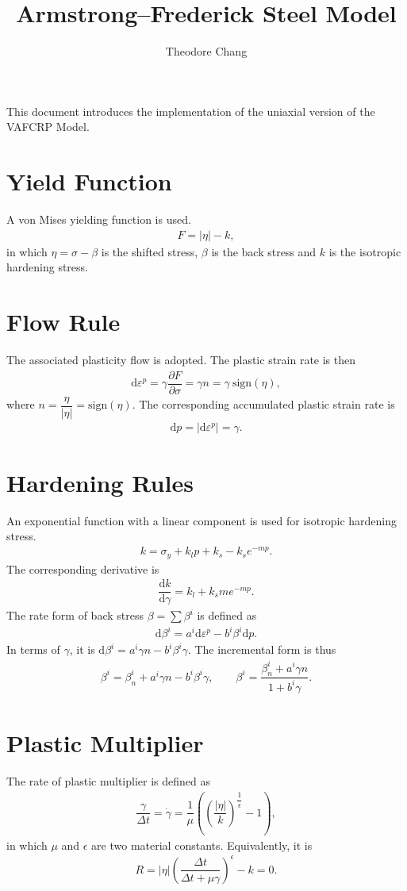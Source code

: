 \documentclass[a4paper,10pt,fleqn]{article}
\title{Armstrong--Frederick Steel Model}
\author{Theodore Chang}
\date{}\pagestyle{empty}
\newcommand*{\md}[1]{\mathrm{d}#1}
\newcommand*{\sign}[1]{\mathrm{sign}\left(#1\right)}
\newcommand*{\pfrac}[2]{\dfrac{\partial#1}{\partial#2}}
\newcommand*{\ddfrac}[2]{\dfrac{\md#1}{\md#2}}
\begin{document}
\noindent{}This document introduces the implementation of the uniaxial version of the VAFCRP Model.
\section{Yield Function}
A von Mises yielding function is used.
\begin{gather}
F=\Big|\eta\Big|-k,
\end{gather}
in which $\eta=\sigma-\beta$ is the shifted stress, $\beta$ is the back stress and $k$ is the isotropic hardening stress.
\section{Flow Rule}
The associated plasticity flow is adopted. The plastic strain rate is then
\begin{gather}
\md{\varepsilon^p}=\gamma\pfrac{F}{\sigma}=\gamma{}n=\gamma~\sign{\eta},
\end{gather}
where $n=\dfrac{\eta}{\Big|\eta\Big|}=\sign{\eta}$. The corresponding accumulated plastic strain rate is
\begin{gather}
\md{p}=\Big|\md{\varepsilon^p}\Big|=\gamma.
\end{gather}
\section{Hardening Rules}
An exponential function with a linear component is used for isotropic hardening stress.
\begin{gather}
k=\sigma_y+k_lp+k_s-k_se^{-mp}.
\end{gather}
The corresponding derivative is
\begin{gather}
\ddfrac{k}{\gamma}=k_l+k_sme^{-mp}.
\end{gather}
The rate form of back stress $\displaystyle\beta=\sum\beta^i$ is defined as
\begin{gather*}
\md{\beta^i}=a^i\md{\varepsilon^p}-b^i\beta^i\md{p}.
\end{gather*}
In terms of $\gamma$, it is $\md{\beta^i}=a^i\gamma{}n-b^i\beta^i\gamma$. The incremental form is thus
\begin{gather}
\beta^i=\beta_n^i+a^i\gamma{}n-b^i\beta^i\gamma,\qquad
\beta^i=\dfrac{\beta_n^i+a^i\gamma{}n}{1+b^i\gamma}.
\end{gather}
\section{Plastic Multiplier}
The rate of plastic multiplier is defined as
\begin{gather}
\dfrac{\gamma}{\Delta{}t}=\dot{\gamma}=\dfrac{1}{\mu}\left(\left(\dfrac{\Big|\eta\Big|}{k}\right)^{\dfrac{1}{\epsilon}}-1\right),
\end{gather}
in which $\mu$ and $\epsilon$ are two material constants. Equivalently, it is
\begin{gather}
R=\Big|\eta\Big|\left(\dfrac{\Delta{}t}{\Delta{}t+\mu\gamma}\right)^\epsilon-k=0.
\end{gather}
\end{document}
